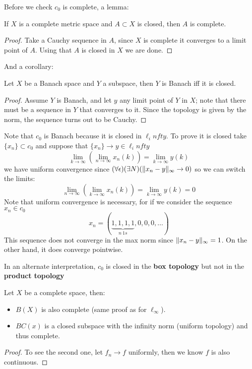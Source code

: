 Before we check $c_0$ is complete, a lemma:
\begin{lema}
If $X$ is a complete metric space and $A\subset X$ is closed, then $A$ is complete.
\begin{proof}
Take a Cauchy sequence in $A$, since $X$ is complete it converges to a limit point of $A$. Using that $A$ is closed in $X$ we are done.
\end{proof}
\end{lema}
And a corollary:
\begin{corol}
Let $X$ be a Banach space and $Y$ a subspace, then $Y$ is Banach iff it is closed.
\begin{proof}
Assume $Y$ is Banach, and let $y$ any limit point of $Y$ in $X$; note that there must be a sequence in $Y$ that converges to it. Since the topology is given by the norm, the sequence turns out to be Cauchy.
\end{proof}
\end{corol}

\begin{examples}
Note that $c_0$ is Banach because it is closed in $\ell_infty$. To prove it is closed take $\{x_n \}\subset c_0$ and suppose that $\{x_n \}\to y\in \ell_infty$
$$\lim_{k\to\infty} \left(\lim_{n\to\infty} x_n(k) \right)=\lim_{k\to \infty} y(k)$$
we have uniform convergence since $(\forall \epsilon)(\exists N)(\Vert x_n - y\Vert_\infty\to 0)$ so we can switch the limits:
$$\lim_{n\to\infty} \left(\lim_{k\to\infty} x_n(k) \right)=\lim_{k\to \infty} y(k)=0$$
Note that uniform convergence is necessary, for if we consider the sequence $x_n \in c_0$ 
$$x_n = ( \underbrace{1,1,1,1}_{n\ 1s},  0,0,0,\ldots)$$
This sequence does not converge in the max norm since $\Vert x_n - y \Vert_\infty= 1$. On the other hand, it does converge pointwise.

In an alternate interpretation, $c_0$ is closed in the \textbf{box topology} but not in the \textbf{product topology}
\end{examples}

\begin{teorema}
    Let $X$ be a complete space, then:
    \begin{itemize}
        \item $B(X)$ is also complete (same proof as for $\ell_\infty$).
        \item $BC(x)$ is a closed subspace with the infinity norm (uniform topology) and thus complete.
    \end{itemize}
    \begin{proof}
        To see the second one, let $f_n \to f$ uniformly, then we know $f$ is also continuous.
    \end{proof}
\end{teorema}

